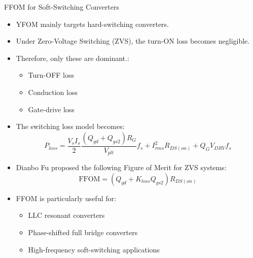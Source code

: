 \begin{frame}{FFOM for Soft-Switching Converters}
\begin{itemize}
    \item YFOM mainly targets hard-switching converters.
    \item Under Zero-Voltage Switching (ZVS), the turn-ON loss becomes negligible.
    \item Therefore, only these are dominant.:
    \begin{itemize}
        \item Turn-OFF loss
        \item Conduction loss
        \item Gate-drive loss
    \end{itemize}


    \item The switching loss model becomes:
    \[
    P_{loss}
    =
    \frac{V_sI_s}{2}
    \frac{(Q_{gd}+Q_{gs2})R_G}{V_{plt}}
    f_s
    +
    I_{rms}^2R_{DS(on)}
    +
    Q_GV_{DRV}f_s
    \]

    \item Dianbo Fu proposed the following Figure of Merit for ZVS systems:
    \[
    \boxed{
    \text{FFOM}
    =
    (Q_{gd}+K_{loss}Q_{gs2})R_{DS(on)}
    }
    \]

    \item FFOM is particularly useful for:
    \begin{itemize}
        \item LLC resonant converters
        \item Phase-shifted full bridge converters
        \item High-frequency soft-switching applications
    \end{itemize}
\end{itemize}
\end{frame}



